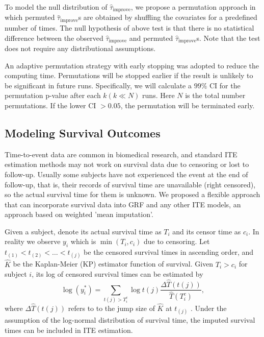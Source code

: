     To model the null distribution of $\hat{\tau}_\mathrm{improve}$, we propose a permutation approach in which permuted $\hat{\tau}_\mathrm{improve}$s are obtained by shuffling the covariates for a predefined number of times. The null hypothesis of above test is that there is no statistical difference between the observed $\hat{\tau}_\mathrm{improve}$ and permuted $\hat{\tau}_\mathrm{improve}$s. Note that the test does not require any distributional assumptions.
    
    An adaptive permutation strategy with early stopping was adopted to reduce the computing time. Permutations will be stopped earlier if the result is unlikely to be significant in future runs. Specifically, we will calculate a $99\%$ CI for the permutation p-value after each $k (k \ll N)$ runs. Here $N$ is the total number permutations. If the lower CI $> 0.05$, the permutation will be terminated early.

  \subsection{Modeling Survival Outcomes}
    Time-to-event data are common in biomedical research, and standard ITE estimation methods may not work on survival data due to censoring or lost to follow-up. Usually some subjects have not experienced the event at the end of follow-up, that is, their records of survival time are unavailable (right censored), so the actual survival time for them is unknown. We proposed a flexible approach that can incorporate survival data into GRF and any other ITE models, an approach based on weighted 'mean imputation'.

    Given a subject, denote its actual survival time as $T_i$ and its censor time as $c_i$. In reality we observe $y_i$ which is $\min(T_i, c_i)$ due to censoring. Let $t_{(1)}< t_{(2)} < \dots < t_{(j)}$ be the censored survival times in ascending order, and $\hat{K}$ be the Kaplan-Meier (KP) estimator function of survival. Given $T_i>c_i$ for subject $i$, its log of censored survival times can be estimated by 
    \begin{equation}
      \log (y_i^{*}) = \sum_{t(j) > T_i^c} \log t(j) \frac{\Delta \hat{T}(t(j))} {\hat{T}(T_i^c)},
    \end{equation}
    where $\Delta \hat{T}(t(j))$ refers to to the jump size of  $\hat{K}$ at $t_{(j)}$ \cite{datta2007predicting}. Under the assumption of the log-normal distribution of survival time, the imputed survival times can be included in ITE estimation. 


